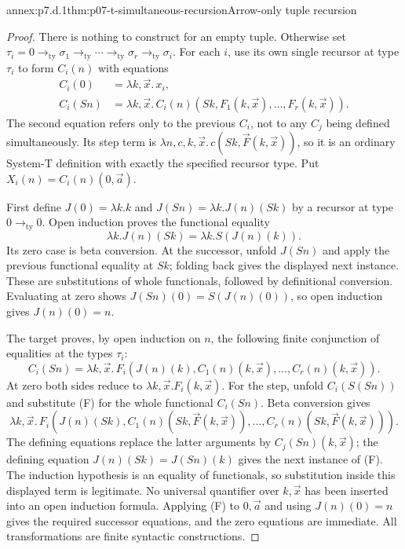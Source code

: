 \begin{annexitem}{annex:p7.d.1}{thm:p07-t-simultaneous-recursion}{Arrow-only tuple recursion}
\begin{proof}
There is nothing to construct for an empty tuple. Otherwise set
\(\tau_i=0\to_{\mathrm{ty}}\sigma_1\to_{\mathrm{ty}}\cdots
\to_{\mathrm{ty}}\sigma_r\to_{\mathrm{ty}}\sigma_i\).
For each \(i\), use its own single recursor at type \(\tau_i\) to
form \(C_i(n)\) with equations
\[
\begin{split}
 C_i(0)&=\lambda k,\vec x.\,x_i,\\
 C_i(Sn)&=\lambda k,\vec x.\,
 C_i(n)(Sk,F_1(k,\vec x),\ldots,F_r(k,\vec x)).
\end{split}
\]
The second equation refers only to the previous \(C_i\), not to
any \(C_j\) being defined simultaneously. Its step term is
\(\lambda n,c,k,\vec x.\,c(Sk,\vec F(k,\vec x))\), so it is an
ordinary System-T definition with exactly the specified recursor type.
Put \(X_i(n)=C_i(n)(0,\vec a)\).

First define \(J(0)=\lambda k.k\) and
\(J(Sn)=\lambda k.J(n)(Sk)\) by a recursor at type
\(0\to_{\mathrm{ty}}0\). Open induction proves the functional
equality
\[
 \lambda k.J(n)(Sk)=\lambda k.S(J(n)(k)).
\]
Its zero case is beta conversion. At the successor, unfold \(J(Sn)\)
and apply the previous functional equality at \(Sk\); folding back
gives the displayed next instance. These are substitutions of whole
functionals, followed by definitional conversion. Evaluating at zero
shows \(J(Sn)(0)=S(J(n)(0))\), so open induction gives
\(J(n)(0)=n\).

The target proves, by open induction on \(n\), the following finite
conjunction of equalities at the types \(\tau_i\):
\[
 C_i(Sn)=\lambda k,\vec x.\,
 F_i(J(n)(k),C_1(n)(k,\vec x),\ldots,C_r(n)(k,\vec x)).
 \tag{F}
\]
At zero both sides reduce to \(\lambda k,\vec x.F_i(k,\vec x)\).
For the step, unfold \(C_i(S(Sn))\) and substitute (F) for the
whole functional \(C_i(Sn)\). Beta conversion gives
\[
 \lambda k,\vec x.\,
 F_i(J(n)(Sk),C_1(n)(Sk,\vec F(k,\vec x)),\ldots,
              C_r(n)(Sk,\vec F(k,\vec x))).
\]
The defining equations replace the latter arguments by
\(C_j(Sn)(k,\vec x)\); the defining equation
\(J(n)(Sk)=J(Sn)(k)\) gives the next instance of (F). The induction hypothesis is an equality
of functionals, so substitution inside this displayed term is legitimate.
No universal quantifier over \(k,\vec x\) has been inserted into an
open induction formula. Applying (F) to \(0,\vec a\) and using \(J(n)(0)=n\) gives the
required successor equations, and the zero equations are immediate.
All transformations are finite syntactic constructions.
\end{proof}
\end{annexitem}

